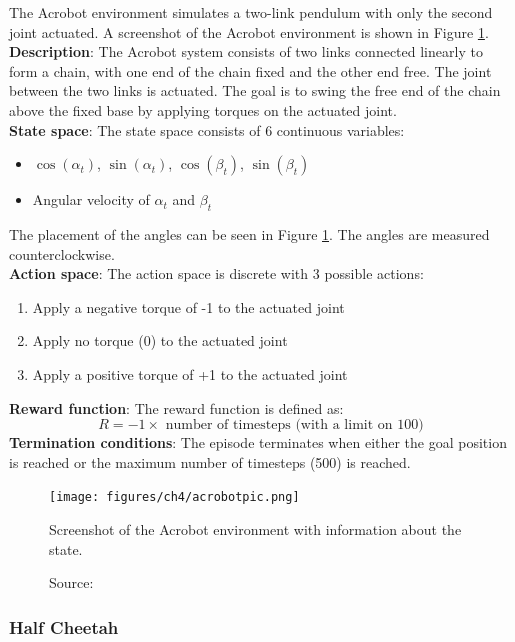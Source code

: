 The Acrobot environment \cite{acrobotfarama} simulates a two-link
pendulum with only the second joint actuated. A screenshot of the
Acrobot environment is shown in Figure \ref{fig:acrobot}.\\
\textbf{Description}: The Acrobot system consists of two links
connected linearly to form a chain, with one end of the chain fixed
and the other end free. The joint between the two links is actuated.
The goal is to swing the free end of the chain above the fixed base
by applying torques on the actuated joint.\\
\textbf{State space}: The state space consists of 6 continuous variables:
\begin{itemize}
    \item $\cos(\alpha_t)$, $\sin(\alpha_t)$, $\cos(\beta_t)$, $\sin(\beta_t)$
    \item Angular velocity of $\alpha_t$ and $\beta_t$
\end{itemize}
The placement of the angles can be seen in Figure \ref{fig:acrobot}.
The angles are measured counterclockwise.\\
\textbf{Action space}: The action space is discrete with 3 possible actions:
\begin{enumerate}
    \item Apply a negative torque of -1 to the actuated joint
    \item Apply no torque (0) to the actuated joint
    \item Apply a positive torque of +1 to the actuated joint
\end{enumerate}
\textbf{Reward function}: The reward function is defined as:
\begin{equation}
    R = -1 \times \text{ number of timesteps (with a limit on 100)}
\end{equation}
\textbf{Termination conditions}: The episode terminates when either
the goal position is reached or the maximum number
of timesteps (500) is reached.

\begin{figure}[h]
    \centering
    \texttt{[image: figures/ch4/acrobotpic.png]}
    \caption{Screenshot of the Acrobot environment with information about the state.}
    \vspace{-10px}
    \caption*{\scriptsize{Source: \cite{acrobotpic}}}
    \label{fig:acrobot}
\end{figure}

\subsubsection{Half Cheetah}


